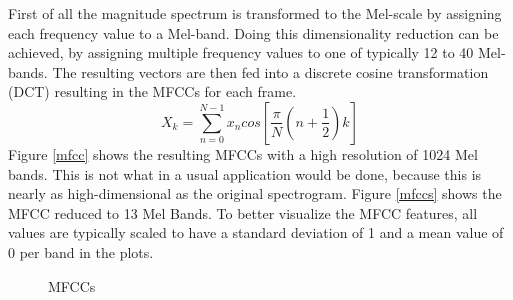 \FloatBarrier
\noindent First of all the magnitude spectrum is transformed to the Mel-scale by assigning each frequency value to a Mel-band.
Doing this dimensionality reduction can be achieved, by assigning multiple frequency values to one of typically 12 to 40 Mel-bands. The resulting vectors are then fed into a discrete cosine transformation (DCT) resulting in the MFCCs for each frame. 
\begin{equation} \label{eq:dct}
X_k = \sum_{n=0}^{N-1}{x_n cos\left[{\frac{\pi}{N}(n + \frac{1}{2})k}\right]}
\end{equation}
Figure \ref{mfcc} shows the resulting MFCCs with a high resolution of 1024 Mel bands. This is not what in a usual application would be done, because this is nearly as high-dimensional as the original spectrogram. Figure \ref{mfccs} shows the MFCC reduced to 13 Mel Bands.
To better visualize the MFCC features, all values are typically scaled to have a standard deviation of 1 and a mean value of 0 per band in the plots. 
\begin{figure}[htbp]
	\centering
	\caption{MFCCs}	
	\label{fig:mfcc}
\end{figure}

